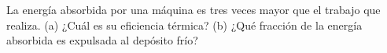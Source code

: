 \item La energía absorbida por una máquina es tres veces mayor que el trabajo que realiza. (a) ¿Cuál es su eficiencia térmica? (b) ¿Qué fracción de la energía absorbida es expulsada al depósito frío?
